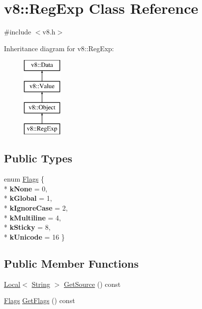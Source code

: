 \hypertarget{classv8_1_1_reg_exp}{}\section{v8\+:\+:Reg\+Exp Class Reference}
\label{classv8_1_1_reg_exp}


{\ttfamily \#include $<$v8.\+h$>$}

Inheritance diagram for v8\+:\+:Reg\+Exp\+:\begin{figure}[H]
\begin{center}
\leavevmode
\includegraphics[height=4.000000cm]{classv8_1_1_reg_exp}
\end{center}
\end{figure}
\subsection*{Public Types}
\begin{DoxyCompactItemize}
\item 
enum \hyperlink{classv8_1_1_reg_exp_aa4718a5c1f18472aff3bf51ed694fc5a}{Flags} \{ \\*
{\bfseries k\+None} = 0, 
\\*
{\bfseries k\+Global} = 1, 
\\*
{\bfseries k\+Ignore\+Case} = 2, 
\\*
{\bfseries k\+Multiline} = 4, 
\\*
{\bfseries k\+Sticky} = 8, 
\\*
{\bfseries k\+Unicode} = 16
 \}
\end{DoxyCompactItemize}
\subsection*{Public Member Functions}
\begin{DoxyCompactItemize}
\item 
\hyperlink{classv8_1_1_local}{Local}$<$ \hyperlink{classv8_1_1_string}{String} $>$ \hyperlink{classv8_1_1_reg_exp_a7c46f39bc3fefddedf5042238d810038}{Get\+Source} () const 
\item 
\hyperlink{classv8_1_1_reg_exp_aa4718a5c1f18472aff3bf51ed694fc5a}{Flags} \hyperlink{classv8_1_1_reg_exp_aab755c6c24fdb9d557b12926637645b0}{Get\+Flags} () const 
\end{DoxyCompactItemize}
